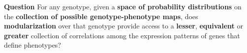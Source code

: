 \begin{frame}
\begin{block}{\textbf{Question}}
For any genotype, given a \textbf{space of probability distributions}
on the \textbf{collection of possible genotype-phenotype maps}, does \textbf{modularization} over that genotype provide access to a \textbf{lesser}, \textbf{equivalent} or \textbf{greater} collection of correlations among the expression patterns of genes that define phenotypes?
\end{block}
\end{frame}